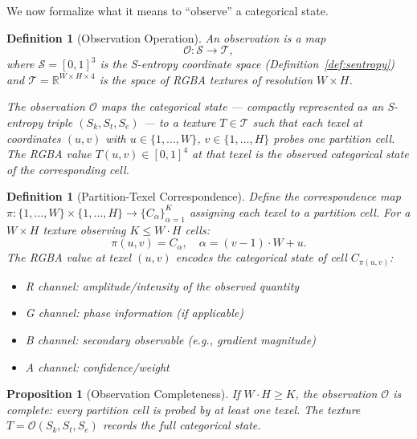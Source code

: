 \documentclass[11pt,twocolumn,a4paper]{article}
\newtheorem{proposition}[theorem]{Proposition}
\newtheorem{definition}[theorem]{Definition}
\newcommand{\Sk}{S_k}
\newcommand{\St}{S_t}
\newcommand{\Se}{S_e}
\newcommand{\R}{\mathbb{R}}
\newcommand{\Tex}{\mathcal{T}}
\newcommand{\Obs}{\mathcal{O}}
\begin{document}
We now formalize what it means to ``observe'' a categorical state.

\begin{definition}[Observation Operation]
\label{def:observation}
An \emph{observation} is a map
\begin{equation}
\Obs : \mathcal{S} \to \Tex,
\label{eq:observation-map}
\end{equation}
where $\mathcal{S} = [0,1]^3$ is the S-entropy coordinate space
(Definition~\ref{def:sentropy}) and
$\Tex = \R^{W \times H \times 4}$ is the space of RGBA textures
of resolution $W \times H$.

The observation $\Obs$ maps the categorical state --- compactly
represented as an S-entropy triple $(\Sk, \St, \Se)$ --- to a
texture $T \in \Tex$ such that each texel at coordinates $(u,v)$
with $u \in \{1,\ldots,W\}$, $v \in \{1,\ldots,H\}$ probes one
partition cell. The RGBA value $T(u,v) \in [0,1]^4$ at that texel
\emph{is} the observed categorical state of the corresponding cell.
\end{definition}

\begin{definition}[Partition-Texel Correspondence]
\label{def:partition-texel}
Define the correspondence map
$\pi : \{1,\ldots,W\} \times \{1,\ldots,H\} \to
\{C_\alpha\}_{\alpha=1}^{K}$
assigning each texel to a partition cell. For a $W \times H$ texture
observing $K \leq W \cdot H$ cells:
\begin{equation}
\pi(u,v) = C_\alpha, \quad \alpha = (v-1) \cdot W + u.
\label{eq:pi}
\end{equation}
The RGBA value at texel $(u,v)$ encodes the categorical state of
cell $C_{\pi(u,v)}$:
\begin{itemize}[leftmargin=*]
\item R channel: amplitude/intensity of the observed quantity
\item G channel: phase information (if applicable)
\item B channel: secondary observable (e.g., gradient magnitude)
\item A channel: confidence/weight
\end{itemize}
\end{definition}

\begin{proposition}[Observation Completeness]
\label{prop:completeness}
If $W \cdot H \geq K$, the observation $\Obs$ is \emph{complete}:
every partition cell is probed by at least one texel. The texture
$T = \Obs(\Sk, \St, \Se)$ records the full categorical state.
\end{proposition}
\end{document}

